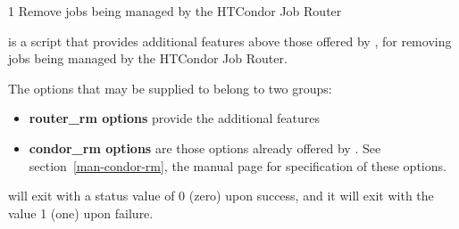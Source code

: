 \begin{ManPage}{\label{man-condor-router-rm}}{1}
{Remove jobs being managed by the HTCondor Job Router}
\Synopsis {}


\Description
{} is a script that provides additional features
above those offered by , 
for removing jobs being managed by the HTCondor Job Router. 

The options that may be supplied to  belong to two groups:
\begin{itemize}
	\item \textbf{router\_rm options} provide the additional features
	\item \textbf{condor\_rm options} are those options already offered
by .  See section~\ref{man-condor-rm},
the  manual page for specification of these options. 
\end{itemize}

\begin{Options}
\end{Options}

\ExitStatus

 will exit with a status value of 0 (zero) upon success,
and it will exit with the value 1 (one) upon failure.

\end{ManPage}

